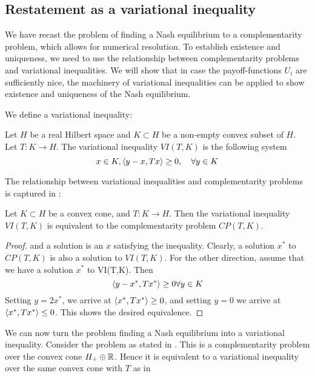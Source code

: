 \subsection{Restatement as a variational inequality}
We have recast the problem of finding a Nash equilibrium to a complementarity problem, which allows for numerical resolution. To establish existence and uniqueness, we need to use the relationship between complementarity problems and variational inequalities. We will show that in case the payoff-functions $U_i $ are sufficiently nice, the machinery of variational inequalities can be applied to show existence and uniqueness of the Nash equilibrium.

We define a variational inequality:
\begin{definition}
  Let $H$ be a real Hilbert space and $K\subset H$ be a non-empty convex subset of $H$. Let $T: K \to H$. The variational inequality $VI(T,K)$ is the following system
  \begin{equation}
    x \in K, \left \langle y-x,Tx \right \rangle \geq 0, \quad \forall y \in K
  \end{equation}
\end{definition}
The relationship between variational inequalities and complementarity problems is captured in \citep[Proposition 12.1]{hadjisavvas2006handbook}:
\begin{proposition}
  Let $K\subset H$ be a convex cone, and $T: K \to H$. Then the variational inequality $VI(T,K)$ is equivalent to the complementarity problem $CP(T,K)$.
\end{proposition}
\begin{proof}
  and a solution is an $x$ satisfying the inequality.
  Clearly, a solution $x^*$ to $CP(T,K)$ is also a solution to $VI(T,K)$. For the other direction, assume that we have a solution $x^*$ to VI(T,K). Then
  \begin{equation}
    \left \langle y - x^*,Tx^* \right \rangle \geq 0 \forall y \in K
  \end{equation}
  Setting $y = 2x^*$, we arrive at $\left \langle x^*,Tx^* \right \rangle \geq 0$, and setting $y=0$ we arrive at $\left \langle x^*,Tx^* \right \rangle \leq 0$. This shows the desired equivalence.
\end{proof}
We can now turn the problem finding a Nash equilibrium into a variational inequality. Consider the problem as stated in . This is a complementarity problem over the convex cone $H_+ \oplus \mathbb{R}$. Hence it is equivalent to a variational inequality over the same convex cone with $T$ as in 
